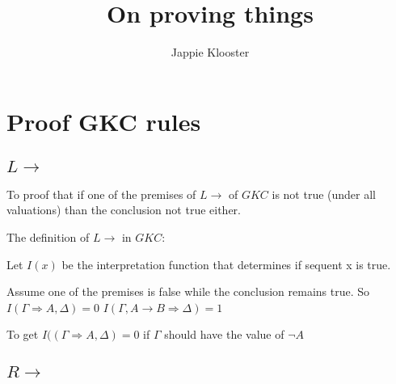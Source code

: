 \documentclass{article}
\newenvironment{scprooftree}[1]%
{\gdef\scalefactor{#1}\begin{center}\proofSkipAmount \leavevmode}%
{\scalebox{\scalefactor}{\DisplayProof}\proofSkipAmount \end{center} }
\begin{document}
\author{Jappie Klooster}
\title{On proving things}
\maketitle

\section{Proof GKC rules}
\subsection{$L\to$}
To proof that if one of the premises of $L\to$ of $GKC$ is not true
(under all valuations) than the conclusion not true either.

The definition of $L\to$ in $GKC$:

\begin{scprooftree}{1}
\end{scprooftree}

Let $I(x)$ be the interpretation function that determines if sequent x
is true.

Assume one of the premises is false while the conclusion remains true.
So $I(\Gamma \Rightarrow A, \Delta) = 0$
$I(\Gamma, A \to B \Rightarrow \Delta) = 1$ 

To get $I((\Gamma \Rightarrow A, \Delta) = 0$ if $\Gamma$ should have 
the value of $\neg A$
\subsection{$R\to$}
\end{document}
